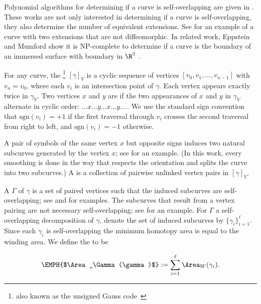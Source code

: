  
Polynomial algorithms for determining if a curve is self-overlapping
are given in  \cite{blank, shor-van-wyk}. These works are not only interested
 in determining if a curve is self-overlapping,
 they also determine the number of equivalent extensions.
 See  for an example of a curve with two extensions
 that are not diffeomorphic.
 In related work, Eppstein and Mumford show it is NP-complete to determine
 if a curve is the boundary of an immersed surface with boundary in $\R^3$
  \cite{eppsteinMumford}.



 For any curve, the %
 \footnote{also known as the unsigned Gauss code~\cite{changErickson17, gauss}}
 $[\gamma]_V$ is a cyclic sequence of vertices $[v_0, v_1, \ldots , v_{n-1}]$ 
 with $v_n = v_0$, where each $v_i$ is an intersection point of $\gamma$.
 Each vertex appears exactly twice in $\gamma_V$.
 Two vertices $x$ and $y$ are  if the two appearances of $x$ and 
 $y$ in $\gamma_V$ alternate in cyclic order:  $\dots x \dots y \dots x \dots y \dots \,$.
 We use the standard sign convention~\cite{changErickson17, gauss} that 
 $\textrm{sgn}(v_i) = +1$ if the first traversal through $v_i$ crosses the second 
 traversal from right to left, and $\textrm{sgn}(v_i)=-1$ otherwise.



 A pair of symbols of the same vertex $x$ but opposite signs induces two 
 natural subcurves generated by  the vertex $x$; 
 see  for an example.
 (In this work, every smoothing is done in the way that respects the orientation 
 and splits the curve into two subcurves.)
 A  is a collection of pairwise unlinked vertex pairs in $[\gamma]_V$.

 A  $\Gamma$ of $\gamma$
 is a set of paired vertices such that
 the induced subcurves are self-overlapping;
 see  and  for examples.
 The subcurves that result from a vertex pairing are not necessary self-overlapping;
 see  for an example.
 For $\Gamma$ a self-overlapping decomposition of $\gamma$,
 denote the set of induced subcurves by $\{\gamma_i\}_{i=1}^\ell$.
 Since each $\gamma_i$ is self-overlapping the minimum homotopy
 area is equal to the winding area.
 We define the 
 to be

 \[
 	\EMPH{$\Area_\Gamma(\gamma)$}:=\sum_{i=1}^\ell \Area_W(\gamma_i).
 \]




